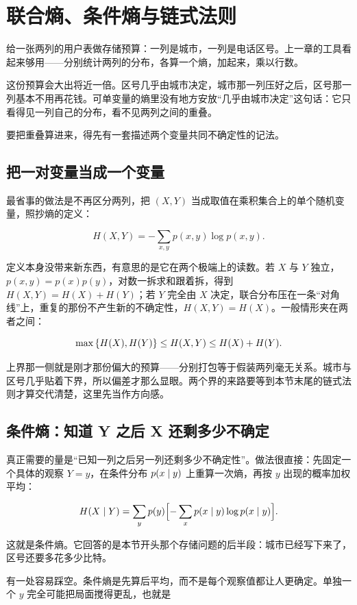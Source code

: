 \section{联合熵、条件熵与链式法则}
\label{sec:07-Information-Theory/02-Joint-Information/01}

给一张两列的用户表做存储预算：一列是城市，一列是电话区号。上一章的工具看起来够用——分别统计两列的分布，各算一个熵，加起来，乘以行数。

这份预算会大出将近一倍。区号几乎由城市决定，城市那一列压好之后，区号那一列基本不用再花钱。可单变量的熵里没有地方安放``几乎由城市决定''这句话：它只看得见一列自己的分布，看不见两列之间的重叠。

要把重叠算进来，得先有一套描述两个变量共同不确定性的记法。

\subsection{把一对变量当成一个变量}

最省事的做法是不再区分两列，把 \((X,Y)\) 当成取值在乘积集合上的单个随机变量，照抄熵的定义：

\[
H(X,Y)=-\sum_{x,y}p(x,y)\log p(x,y).
\]

定义本身没带来新东西，有意思的是它在两个极端上的读数。若 \(X\) 与 \(Y\) 独立，\(p(x,y)=p(x)p(y)\)，对数一拆求和跟着拆，得到 \(H(X,Y)=H(X)+H(Y)\)；若 \(Y\) 完全由 \(X\) 决定，联合分布压在一条``对角线''上，重复的那份不产生新的不确定性，\(H(X,Y)=H(X)\)。一般情形夹在两者之间：

\[
\max\left\{H(X),H(Y)\right\}\le H(X,Y)\le H(X)+H(Y).
\]

上界那一侧就是刚才那份偏大的预算——分别打包等于假装两列毫无关系。城市与区号几乎贴着下界，所以偏差才那么显眼。两个界的来路要等到本节末尾的链式法则才算交代清楚，这里先当作方向感。

\subsection{条件熵：知道 Y 之后 X 还剩多少不确定}

真正需要的量是``已知一列之后另一列还剩多少不确定性''。做法很直接：先固定一个具体的观察 \(Y=y\)，在条件分布 \(p(x\mid y)\) 上重算一次熵，再按 \(y\) 出现的概率加权平均：

\[
H(X\mid Y)=\sum_y p(y)\Bigl[-\sum_x p(x\mid y)\log p(x\mid y)\Bigr].
\]

这就是条件熵。它回答的是本节开头那个存储问题的后半段：城市已经写下来了，区号还要多花多少比特。

有一处容易踩空。条件熵是先算后平均，而不是每个观察值都让人更确定。单独一个 \(y\) 完全可能把局面搅得更乱，也就是

